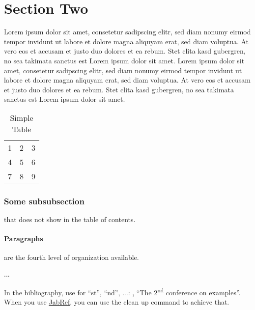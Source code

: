 \section{Section Two} \label{sec:two}
Lorem ipsum dolor sit amet, consetetur sadipscing elitr, sed diam nonumy eirmod tempor invidunt ut labore et dolore magna aliquyam erat, sed diam voluptua. At vero eos et accusam et justo duo dolores et ea rebum. Stet clita kasd gubergren, no sea takimata sanctus est Lorem ipsum dolor sit amet. Lorem ipsum dolor sit amet, consetetur sadipscing elitr, sed diam nonumy eirmod tempor invidunt ut labore et dolore magna aliquyam erat, sed diam voluptua. At vero eos et accusam et justo duo dolores et ea rebum. Stet clita kasd gubergren, no sea takimata sanctus est Lorem ipsum dolor sit amet.


\begin{table}
  \centering
  \begin{tabular}{ | l || c ||| r }
      1 & 2 & 3 \\
      4 & 5 & 6 \\ \hline
      7 & 8 & 9 \\
  \end{tabular}
  \caption{Simple Table} \label{tab:simple}
\end{table}

\subsubsection*{Some subsubsection} that does not show in the table of contents.

\paragraph{Paragraphs} are the fourth level of organization available.

...

In the bibliography, use  for \enquote{st}, \enquote{nd}, ...:
\eg, \enquote{The 2\textsuperscript{nd} conference on examples}.
When you use \href{http://www.jabref.org}{JabRef}, you can use the clean up command to achieve that.